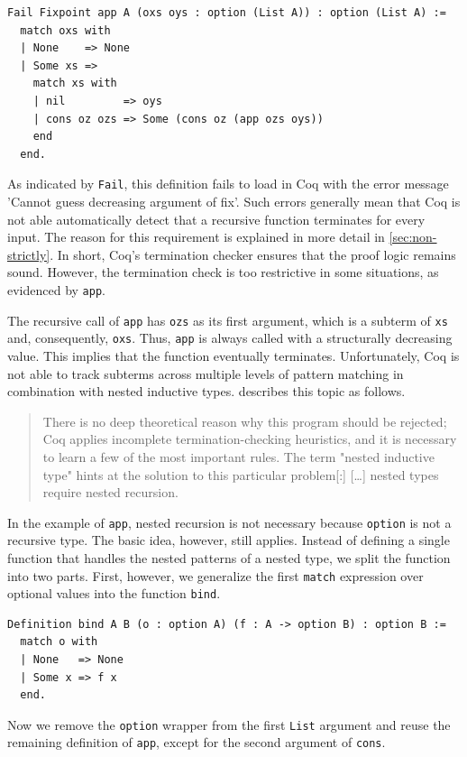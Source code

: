 \documentclass[a4paper, 11pt, fleqn, twoside, abstract=on]{scrreprt}
\newcommand{\cinl}[1]{\texttt{#1}}
\begin{document}
\begin{verbatim}
Fail Fixpoint app A (oxs oys : option (List A)) : option (List A) :=
  match oxs with
  | None    => None
  | Some xs =>
    match xs with
    | nil         => oys
    | cons oz ozs => Some (cons oz (app ozs oys))
    end
  end.
\end{verbatim}
\noindent
As indicated by \cinl{Fail}, this definition fails to load in Coq with the error message 'Cannot guess decreasing argument of fix'.
Such errors generally mean that Coq is not able automatically detect that a recursive function terminates for every input.
The reason for this requirement is explained in more detail in \autoref{sec:non-strictly}.
In short, Coq's termination checker ensures that the proof logic remains sound.
However, the termination check is too restrictive in some situations, as evidenced by \cinl{app}.

The recursive call of \cinl{app} has \cinl{ozs} as its first argument, which is a subterm of \cinl{xs} and, consequently, \cinl{oxs}.
Thus, \cinl{app} is always called with a structurally decreasing value.
This implies that the function eventually terminates.
Unfortunately, Coq is not able to track subterms across multiple levels of pattern matching in combination with nested inductive types. \citet{chlipala2013certified} describes this topic as follows.

\begin{quotation}
\noindent
There is no deep theoretical reason why this program should be rejected; Coq applies incomplete termination-checking heuristics, and it is necessary to learn a few of the most important rules.
The term "nested inductive type" hints at the solution to this particular problem[:] [\dots{}] nested types require nested recursion.
\end{quotation}
\noindent
In the example of \cinl{app}, nested recursion is not necessary because \cinl{option} is not a recursive type.
The basic idea, however, still applies.
Instead of defining a single function that handles the nested patterns of a nested type, we split the function into two parts.
First, however, we generalize the first \cinl{match} expression over optional values into the function \cinl{bind}.
\pagebreak
\begin{verbatim}
Definition bind A B (o : option A) (f : A -> option B) : option B :=
  match o with
  | None   => None
  | Some x => f x
  end.
\end{verbatim}

Now we remove the \cinl{option} wrapper from the first \cinl{List} argument and reuse the remaining definition of \cinl{app}, except for the second argument of \cinl{cons}.
\end{document}
